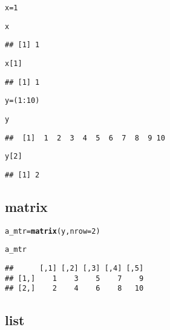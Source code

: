 \documentclass[a4paper,10pt]{book}\usepackage[]{graphicx}\usepackage[]{color}
\makeatletter
\newcommand{\hlnum}[1]{\textcolor[rgb]{0.686,0.059,0.569}{#1}}%
\newcommand{\hlopt}[1]{\textcolor[rgb]{0,0,0}{#1}}%
\newcommand{\hlstd}[1]{\textcolor[rgb]{0.345,0.345,0.345}{#1}}%
\newcommand{\hlkwb}[1]{\textcolor[rgb]{0.69,0.353,0.396}{#1}}%
\newcommand{\hlkwc}[1]{\textcolor[rgb]{0.333,0.667,0.333}{#1}}%
\newcommand{\hlkwd}[1]{\textcolor[rgb]{0.737,0.353,0.396}{\textbf{#1}}}%
\newenvironment{kframe}{%
 \def\at@end@of@kframe{}%
 \ifinner\ifhmode%
  \def\at@end@of@kframe{\end{minipage}}%
  \begin{minipage}{\columnwidth}%
 \fi\fi%
 \def\FrameCommand##1{\hskip\@totalleftmargin \hskip-\fboxsep
 \colorbox{shadecolor}{##1}\hskip-\fboxsep
     \hskip-\linewidth \hskip-\@totalleftmargin \hskip\columnwidth}%
 \MakeFramed {\advance\hsize-\width
   \@totalleftmargin\z@ \linewidth\hsize
   \@setminipage}}%
 {\par\unskip\endMakeFramed%
 \at@end@of@kframe}
\newenvironment{knitrout}{}{} %
\makeatother
\begin{document}
\begin{knitrout}
\color{fgcolor}\begin{kframe}
\begin{alltt}
\hlstd{x} \hlkwb{=} \hlnum{1}

\hlstd{x}
\end{alltt}
\begin{verbatim}
## [1] 1
\end{verbatim}
\begin{alltt}
\hlstd{x[}\hlnum{1}\hlstd{]}
\end{alltt}
\begin{verbatim}
## [1] 1
\end{verbatim}
\begin{alltt}
\hlstd{y} \hlkwb{=} \hlstd{(}\hlnum{1}\hlopt{:}\hlnum{10}\hlstd{)}

\hlstd{y}
\end{alltt}
\begin{verbatim}
##  [1]  1  2  3  4  5  6  7  8  9 10
\end{verbatim}
\begin{alltt}
\hlstd{y[}\hlnum{2}\hlstd{]}
\end{alltt}
\begin{verbatim}
## [1] 2
\end{verbatim}
\end{kframe}
\end{knitrout}


\subsection{matrix}

\begin{knitrout}
\color{fgcolor}\begin{kframe}
\begin{alltt}
\hlstd{a_mtr} \hlkwb{=} \hlkwd{matrix}\hlstd{(y,} \hlkwc{nrow}\hlstd{=}\hlnum{2}\hlstd{)}

\hlstd{a_mtr}
\end{alltt}
\begin{verbatim}
##      [,1] [,2] [,3] [,4] [,5]
## [1,]    1    3    5    7    9
## [2,]    2    4    6    8   10
\end{verbatim}
\end{kframe}
\end{knitrout}

\subsection{list}
\end{document}
